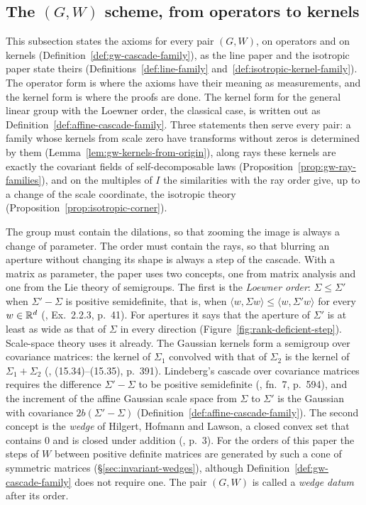 \subsection{The \texorpdfstring{$(G, W)$}{(G, W)} scheme, from operators to kernels}\label{sec:affine-covariance}

This subsection states the axioms for every pair $(G, W)$, on operators and on kernels
(Definition~\ref{def:gw-cascade-family}), as the line paper and the isotropic paper state theirs
(Definitions~\ref{def:line-family} and~\ref{def:isotropic-kernel-family}). The operator form is
where the axioms have their meaning as measurements, and the kernel form is where the proofs are
done. The kernel form for the general linear group with the Loewner order, the classical case, is
written out as Definition~\ref{def:affine-cascade-family}. Three statements then serve every pair: a
family whose kernels from scale zero have transforms without zeros is determined by them
(Lemma~\ref{lem:gw-kernels-from-origin}), along rays these
kernels are exactly the covariant fields of self-decomposable laws
(Proposition~\ref{prop:gw-ray-families}), and on the multiples of $I$ the similarities with the ray
order give, up to a change of the scale coordinate, the isotropic theory
(Proposition~\ref{prop:isotropic-corner}).

The group must contain the dilations, so that zooming the image is always a change of parameter. The
order must contain the rays, so that blurring an aperture without changing its shape is always a
step of the cascade. With a matrix as parameter, the paper uses two concepts, one from matrix analysis
and one from the Lie theory of semigroups. The first is the \emph{Loewner order}: $\Sigma \le \Sigma'$
when $\Sigma' - \Sigma$ is positive semidefinite, that is, when
$\langle w, \Sigma w\rangle \le \langle w, \Sigma' w\rangle$ for every $w \in \mathbb{R}^d$
(, Ex.~2.2.3, p.~41). For apertures it says that the aperture of
$\Sigma'$ is at least as wide as that of $\Sigma$ in every direction
(Figure~\ref{fig:rank-deficient-step}). Scale-space theory uses it already. The Gaussian kernels form
a semigroup over covariance matrices: the kernel of $\Sigma_1$ convolved with that of $\Sigma_2$ is the
kernel of $\Sigma_1 + \Sigma_2$ (, (15.34)--(15.35), p.~391). Lindeberg's
cascade over covariance matrices requires the difference $\Sigma' - \Sigma$ to be positive semidefinite
(, fn.~7, p.~594), and the increment of the affine Gaussian scale
space from $\Sigma$ to $\Sigma'$ is the Gaussian with covariance $2b(\Sigma' - \Sigma)$
(Definition~\ref{def:affine-cascade-family}). The second concept is the \emph{wedge} of Hilgert,
Hofmann and Lawson, a closed convex set that contains $0$ and is closed under addition
(, p.~3). For the orders of this paper the steps of $W$ between positive
definite matrices are generated by such a cone of symmetric matrices (\S\ref{sec:invariant-wedges}),
although Definition~\ref{def:gw-cascade-family} does not require one. The pair $(G, W)$ is called a
\emph{wedge datum} after its order.

